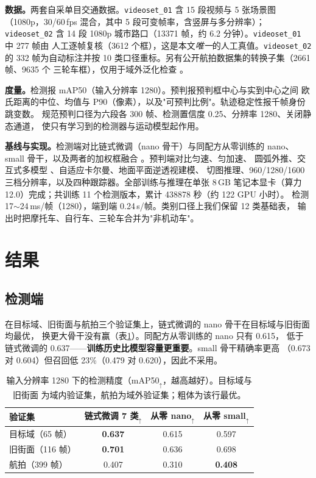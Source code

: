 \documentclass[11pt,a4paper]{ctexart}
\begin{document}
\textbf{数据。}两套自采单目交通数据。\texttt{videoset\_01} 含 15 段视频与 5 张场景图
（1080p，30/60\,fps 混合，其中 5 段可变帧率，含竖屏与多分辨率）；\texttt{videoset\_02}
含 14 段 1080p 城市路口（13371 帧，约 6.2 分钟）。\texttt{videoset\_01} 中 277 帧由
人工逐帧复核（3612 个框），这是本文\emph{唯一}的人工真值。\texttt{videoset\_02} 的
332 帧为自动标注并按 10 类口径重标。另有公开航拍数据集的转换子集（2661 帧、9635 个
三轮车框），仅用于域外泛化检查 \citep{zhu2022visdrone}。

\textbf{度量。}检测报 mAP50（输入分辨率 1280）。预判报预判框中心与实到中心之间
欧氏距离的中位、均值与 P90（像素），以及"可预判比例"。轨迹稳定性报千帧身份跳变数。
规范预判口径为六段各 300 帧、检测置信度 0.25、分辨率 1280、关闭静态通道，
使只有学习到的检测器与运动模型起作用。

\textbf{基线与实现。}检测端对比链式微调（nano 骨干）与同配方从零训练的 nano、
small 骨干，以及两者的加权框融合 \citep{solovyev2021wbf}。预判端对比匀速、匀加速、
圆弧外推、交互式多模型 \citep{blom1988imm}、自适应卡尔曼、地面平面逆透视建模、
切图推理、960/1280/1600 三档分辨率，以及四种跟踪器。全部训练与推理在单张 8\,GB
笔记本显卡（算力 12.0）完成；共训练 11 个检测版本，累计 438878 秒（约 122 GPU 小时）。
检测 17$\sim$24\,ms/帧（1280），端到端 0.24\,s/帧。类别口径上我们保留 12 类基础表，
输出时把摩托车、自行车、三轮车合并为"非机动车"。

\section{结果}
\label{sec:results}

\subsection{检测端}

在目标域、旧街面与航拍三个验证集上，链式微调的 nano 骨干在目标域与旧街面均最优，
换更大骨干没有赢（表\ref{tab:detect}）。同配方从零训练的 nano 只有 0.615，
低于链式微调的 0.637——\textbf{训练历史比模型容量更重要}。small 骨干精确率更高
（0.673 对 0.604）但召回低 23\%（0.479 对 0.620），因此不采用。

\begin{table}[t]\centering\small
\caption{输入分辨率 1280 下的检测精度（mAP50$_{\uparrow}$，越高越好）。目标域与旧街面
为域内验证集，航拍为域外验证集；粗体为该行最优。}
\label{tab:detect}
\begin{tabular}{lccc}
\toprule
验证集 & 链式微调 7 类$_{\uparrow}$ & 从零 nano$_{\uparrow}$ & 从零 small$_{\uparrow}$ \\
\midrule
目标域（65 帧） & \textbf{0.637} & 0.615 & 0.597 \\
旧街面（116 帧） & \textbf{0.701} & 0.636 & 0.698 \\
航拍（399 帧） & 0.407 & 0.310 & \textbf{0.408} \\
\bottomrule
\end{tabular}
\end{table}
\end{document}
